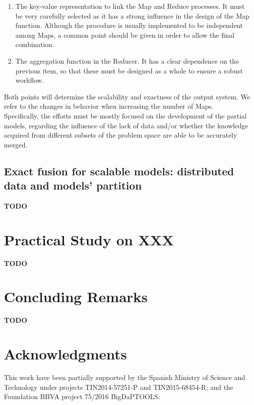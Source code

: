 \documentclass[3p,review]{elsarticle}
\newcommand{\TODO}{\textbf{TODO}}
\begin{document}
\begin{enumerate}
\item The key-value representation to link the Map and Reduce processes. It must be very carefully selected as it has a strong influence in the design of the Map function. Although the procedure is usually implemented to be independent among Maps, a common point should be given in order to allow the final combination. 

\item The aggregation function in the Reducer. It has a clear dependence on the previous item, so that these must be designed as a whole to ensure a robust workflow.

\end{enumerate}

Both points will determine the scalability and exactness of the output system. We refer to the changes in behavior when increasing the number of Maps. Specifically, the efforts must be mostly focused on the development of the partial models, regarding the influence of the lack of data and/or whether the knowledge acquired from different subsets of the problem space are able to be accurately merged.

\subsection{Exact fusion for scalable models: distributed data and models' partition}\label{subsec:exact}

\TODO

\section{Practical Study on XXX}\label{sec:exp}

\TODO



\section{Concluding Remarks}\label{sec:conclusions}

\TODO

\section*{Acknowledgments}\label{sec:ack}

This work have been partially supported by the Spanish Ministry of Science and Technology under projects TIN2014-57251-P and TIN2015-68454-R; and the Foundation BBVA project 75/2016 BigDaPTOOLS.

\noindent{}\label{sec:biblio}



\end{document}
